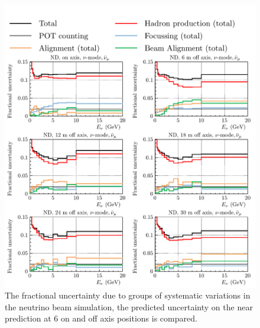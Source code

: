 \documentclass{article}
\begin{document}
\begin{figure}
  \centering
  \includegraphics[width=\textwidth]{plots/fracerrs/numode_numubar_ErrType_OffAxis}
  \caption{The fractional uncertainty due to groups of systematic variations in the neutrino beam simulation, the predicted uncertainty on the near prediction at 6 on and off axis positions is compared.}
  \label{fig:grp_nu_numubar_offaxis}
\end{figure}
\end{document}
